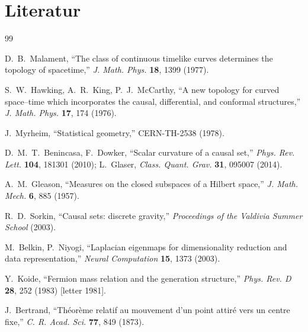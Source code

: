 \documentclass[10pt,twoside,openany]{book}
\begin{document}

\chapter{Literatur}
\label{app:references}

\begin{thebibliography}{99}

D.~B.~Malament, ``The class of continuous timelike curves determines the topology of
spacetime,'' \emph{J. Math. Phys.} \textbf{18}, 1399 (1977).

S.~W.~Hawking, A.~R.~King, P.~J.~McCarthy, ``A new topology for curved space--time which
incorporates the causal, differential, and conformal structures,'' \emph{J. Math. Phys.}
\textbf{17}, 174 (1976).

J.~Myrheim, ``Statistical geometry,'' CERN-TH-2538 (1978).

D.~M.~T.~Benincasa, F.~Dowker, ``Scalar curvature of a causal set,'' \emph{Phys. Rev. Lett.}
\textbf{104}, 181301 (2010); L.~Glaser, \emph{Class. Quant. Grav.} \textbf{31}, 095007
(2014).

A.~M.~Gleason, ``Measures on the closed subspaces of a Hilbert space,''
\emph{J. Math. Mech.} \textbf{6}, 885 (1957).

R.~D.~Sorkin, ``Causal sets: discrete gravity,'' \emph{Proceedings of the Valdivia Summer
School} (2003).

M.~Belkin, P.~Niyogi, ``Laplacian eigenmaps for dimensionality reduction and data
representation,'' \emph{Neural Computation} \textbf{15}, 1373 (2003).

Y.~Koide, ``Fermion mass relation and the generation structure,'' \emph{Phys. Rev. D}
\textbf{28}, 252 (1983) [letter 1981].

J.~Bertrand, ``Th\'eor\`eme relatif au mouvement d'un point attir\'e vers un centre fixe,''
\emph{C. R. Acad. Sci.} \textbf{77}, 849 (1873).

\end{thebibliography}
\end{document}
